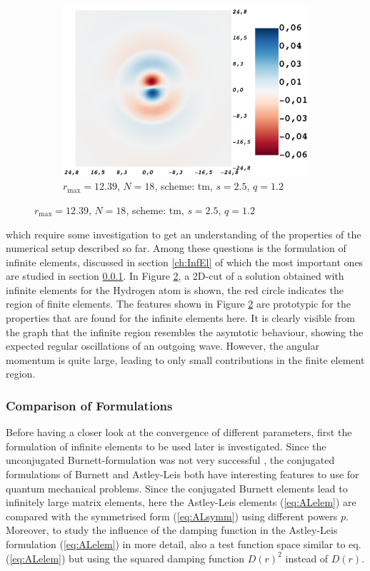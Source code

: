 \begin{figure}
\begin{subfigure}{0.5\textwidth}
   \includegraphics[width=\textwidth]{Figures/RBF/p_wave}
   \caption{$r_\text{max}=12.39$, $N=18$, scheme: tm, $s=2.5$, $q=1.2$}
   \label{fig:cutInf}
\end{subfigure}
\end{figure}
which require some investigation to get an understanding of the properties of the numerical setup described so far.
Among these questions is the formulation of infinite elements, discussed in section \ref{ch:InfEl} of which the most important ones are studied in section \ref{ch:bmFormul}.
In Figure \ref{fig:cutInf}, a 2D-cut of a solution obtained with infinite elements for the Hydrogen atom is shown, the red circle indicates the region of finite elements.
The features shown in Figure \ref{fig:cutInf} are prototypic for the properties that are found for the infinite elements here.
It is clearly visible from the graph that the infinite region resembles the asymtotic behaviour, showing the expected regular oscillations of an outgoing wave.
However, the angular momentum is quite large, leading to only small contributions in the finite element region.

\subsubsection{Comparison of Formulations}
\label{ch:bmFormul}
Before having a closer look at the convergence of different parameters, first the formulation of infinite elements to be used later is investigated.
Since the unconjugated Bur\-nett-formulation was not very successful \cite{dreyer}, the conjugated formulations of Burnett and Astley-Leis both have interesting features to use for quantum mechanical problems.
Since the conjugated Burnett elements lead to infinitely large matrix elements, here the Astley-Leis elements (\ref{eq:ALelem}) are compared with the symmetrised form (\ref{eq:ALsymm}) using different powers $p$.
Moreover, to study the influence of the damping function in the Astley-Leis formulation (\ref{eq:ALelem}) in more detail, also a test function space similar to eq. (\ref{eq:ALelem}) but using the squared damping function $D(r)^2$ instead of $D(r)$.

